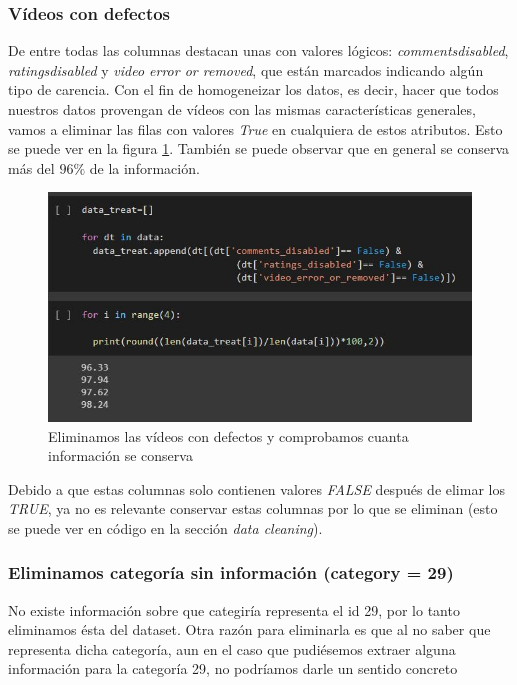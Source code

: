 \documentclass[a4paper,12pt]{article}
\begin{document}
\subsubsection{V\'ideos con defectos}

De entre todas las columnas destacan unas con valores l\'ogicos:  {\itshape commentsdisabled}, {\itshape ratingsdisabled} y {\itshape video error or removed}, que est\'an marcados indicando alg\'un tipo de carencia. Con el fin de homogeneizar los datos, es decir, hacer que todos nuestros datos provengan de v\'ideos con las mismas caracter\'isticas generales, vamos a eliminar las filas con valores {\itshape True} en cualquiera de estos atributos. Esto se puede ver en la figura \ref{fig:defect}. Tambi\'en se puede observar que en general se conserva m\'as del $96\%$ de la informaci\'on. 


\begin{figure}[h!]
\centering
\includegraphics[width=13cm]{data_selection_2.JPG}
\caption{Eliminamos las v\'ideos con defectos y comprobamos cuanta informaci\'on se conserva}
\label{fig:defect}
\end{figure}




Debido a que estas columnas solo contienen valores {\itshape FALSE} despu\'es de elimar los {\itshape TRUE}, ya no es relevante conservar estas columnas por lo que se eliminan (esto se puede ver en c\'odigo en la secci\'on {\itshape data cleaning}).

\subsubsection{Eliminamos categor\'ia sin informaci\'on (category = 29)}

No existe informaci\'on sobre que categir\'ia representa el id 29, por lo tanto eliminamos \'esta del dataset. Otra raz\'on para eliminarla es que al no saber que representa dicha categor\'ia, aun en el caso que pudi\'esemos extraer alguna informaci\'on para la categor\'ia 29, no podr\'iamos darle un sentido concreto
\end{document}
